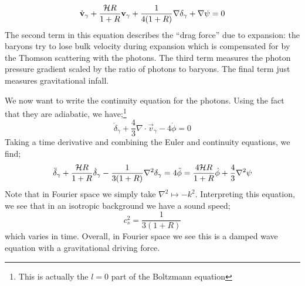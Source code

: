 \begin{equation}
\dot{\mathbf{v}}_{\gamma} + \frac{\mathcal{H} R}{1 + R} \mathbf{v}_{\gamma} + \frac{1}{4(1 + R)}\nabla \delta_{\gamma} + \nabla \psi = 0
\end{equation}
The second term in this equation describes the ``drag force'' due to expansion: the baryons try to lose bulk velocity during expansion which is compensated for by the Thomson scattering with the photons. The third term measures the photon pressure gradient scaled by the ratio of photons to baryons. The final term just measures gravitational infall.

\paraskip
We now want to write the continuity equation for the photons. Using the fact that they are adiabatic, we have;\footnote{This is actually the $l = 0$ part of the Boltzmann equation}
\begin{equation}
\dot{\delta}_\gamma + \frac{4}{3}\nabla \cdot \vec{v}_\gamma - 4\dot{\phi} = 0
\end{equation}
Taking a time derivative and combining the Euler and continuity equations, we find;
\begin{equation}
\ddot{\delta}_\gamma + \frac{\mathcal{H} R}{1 + R}\dot{\delta}_\gamma - \frac{1}{3(1 + R)}\nabla^2 \delta_\gamma = 4\ddot{\phi} = \frac{4\mathcal{H} R}{1 + R}\dot{\phi} + \frac{4}{3}\nabla^2 \psi
\end{equation}
Note that in Fourier space we simply take $\nabla^2 \mapsto -k^2$. Interpreting this equation, we see that in an isotropic background we have a sound speed;
\begin{equation*}
c_s^{2} = \frac{1}{3(1 + R)}
\end{equation*}
which varies in time. Overall, in Fourier space we see this is a damped wave equation with a gravitational driving force.
